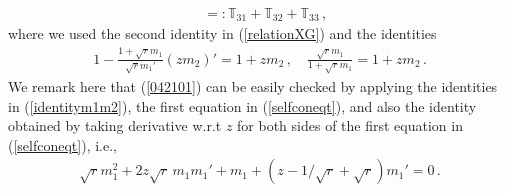 \documentclass[12pt]{article}
\numberwithin{equation}{section}
\theoremstyle{remark}
\newcommand{\1}{{\rm 1}\kern-0.24em{\rm I}}
\begin{document}
\begin{appendices}
\begin{align}
&=:\mathds{T}_{31}+ \mathds{T}_{32}+ \mathds{T}_{33}\,,
 \end{align}
 where we used the second identity in (\ref{relationXG}) and the identities
 \begin{align}
 1-\frac{1+\sqrt r m_1}{\sqrt r m_1'} (zm_2)' = 1+ zm_2\,, \quad  \frac{\sqrt r m_1}{1+\sqrt r m_1} = 1+zm_2\,. \label{042101}
 \end{align}
 We remark here that (\ref{042101}) can be easily checked by applying the identities in (\ref{identitym1m2}),  the first equation in (\ref{selfconeqt}),  and also the identity obtained by taking derivative w.r.t $z$ for both sides of the first equation in (\ref{selfconeqt}), i.e.,
 \begin{align*}
\sqrt  r m_1^2 + 2z \sqrt r\,  m_1m_1' + m_1+ (z-1/\sqrt r+\sqrt r)m_1'=0\,.
 \end{align*}
 

\end{appendices}
\end{document}
